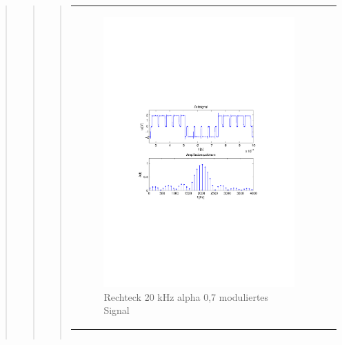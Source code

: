 \begin{quote}
\begin{quote}
\begin{quote}
\begin{center}
\begin{tabular}{ll}
                \begin{minipage}{0.6\textwidth}
                    \begin{figure}[H]
                        \includegraphics[scale=0.7, trim = 35mm 100mm 35mm 95mm, clip]{Bilder/shaperec20_07abget_zeit}
                       \caption{Rechteck 20 kHz alpha 0,7 moduliertes Signal}
		              \label{fig:shaperec20_07zeit}
                    \end{figure}
                \end{minipage}
            
            \end{tabular}
            \end{center}
            
            \begin{center}
            \begin{tabular}{ll}
            

\end{tabular}
\end{center}
\end{quote}
\end{quote}
\end{quote}
